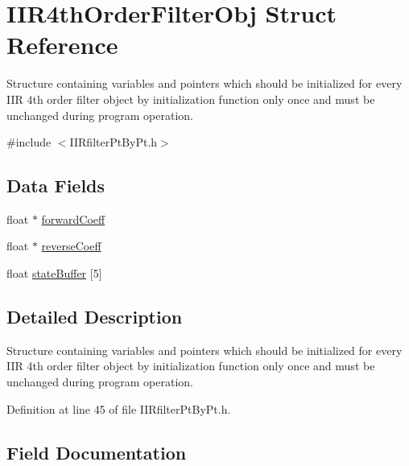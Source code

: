 \hypertarget{struct_i_i_r4th_order_filter_obj}{}\section{I\+I\+R4th\+Order\+Filter\+Obj Struct Reference}
\label{struct_i_i_r4th_order_filter_obj}


Structure containing variables and pointers which should be initialized for every I\+IR 4th order filter object by initialization function only once and must be unchanged during program operation.  




{\ttfamily \#include $<$I\+I\+Rfilter\+Pt\+By\+Pt.\+h$>$}

\subsection*{Data Fields}
\begin{DoxyCompactItemize}
\item 
float $\ast$ \mbox{\hyperlink{struct_i_i_r4th_order_filter_obj_a8ce8a125811ae1ef41f12b57bda41654_a8ce8a125811ae1ef41f12b57bda41654}{forward\+Coeff}}
\item 
float $\ast$ \mbox{\hyperlink{struct_i_i_r4th_order_filter_obj_a71cf702e70d0407aedf468a1d5f09242_a71cf702e70d0407aedf468a1d5f09242}{reverse\+Coeff}}
\item 
float \mbox{\hyperlink{struct_i_i_r4th_order_filter_obj_a498b39863252152549078f926f0b51f8_a498b39863252152549078f926f0b51f8}{state\+Buffer}} \mbox{[}5\mbox{]}
\end{DoxyCompactItemize}


\subsection{Detailed Description}
Structure containing variables and pointers which should be initialized for every I\+IR 4th order filter object by initialization function only once and must be unchanged during program operation. 

Definition at line 45 of file I\+I\+Rfilter\+Pt\+By\+Pt.\+h.



\subsection{Field Documentation}
\mbox{\label{struct_i_i_r4th_order_filter_obj_a8ce8a125811ae1ef41f12b57bda41654_a8ce8a125811ae1ef41f12b57bda41654}} 
